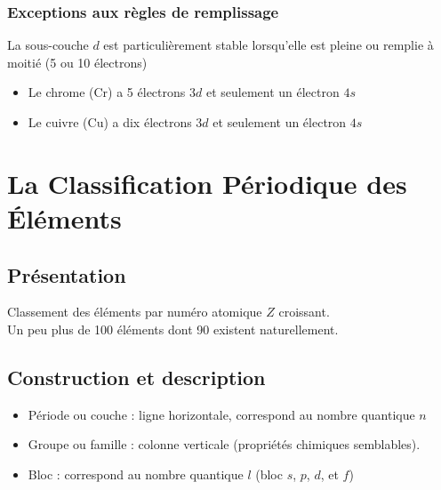 \documentclass[13pt, twoside, a4paper, french, tikz]{report}
\begin{document}
{        \subsection{Exceptions aux règles de remplissage}\label{subsec:exceptions-aux-regles-de-remplissage}

        La sous-couche $d$ est particulièrement stable lorsqu'elle est pleine ou remplie à moitié (5 ou 10 électrons)
        \begin{itemize}
            \item Le chrome (Cr) a 5 électrons $3d$ et seulement un électron $4s$
            \item Le cuivre (Cu) a dix électrons $3d$ et seulement un électron $4s$
        \end{itemize}
    }


    \chapter{La Classification Périodique des Éléments}\label{ch:la-classification-periodique-des-elements}


    \section{Présentation}\label{sec:presentation}

    Classement des éléments par numéro atomique $Z$ croissant.\\
    Un peu plus de 100 éléments dont 90 existent naturellement.


    \section{Construction et description}\label{sec:construction-et-description}

    \resizebox{\textwidth}{!}{
        
    }

    \begin{itemize}
        \item Période ou couche : ligne horizontale, correspond au nombre quantique $n$
        \item Groupe ou famille : colonne verticale (propriétés chimiques semblables).
        \item Bloc : correspond au nombre quantique $l$ (bloc $s$, $p$, $d$, et $f$)
    \end{itemize}

    \vspace{7pt}
\end{document}
